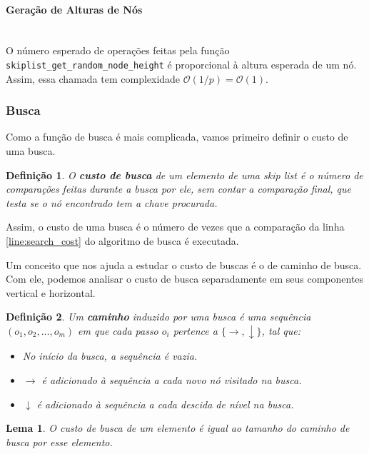 \documentclass[paper=a4, fontsize=11pt]{scrartcl} %
\newtheorem{definition}{Definição}
\newtheorem{lemma}[theorem]{Lema}
\numberwithin{equation}{section}
\numberwithin{figure}{section}
\numberwithin{table}{section}
\numberwithin{definition}{section}
\numberwithin{theorem}{section}
\numberwithin{property}{section}
\numberwithin{proposition}{section}
\newcommand{\cO}{\ensuremath{\mathcal{O}}}
\renewcommand{\sl}{\textit{skip list}\xspace}
\begin{document}
\paragraph{Geração de Alturas de Nós}
\ \\
O número esperado de operações feitas pela função \verb|skiplist_get_random_node_height| é proporcional à 
altura esperada de um nó. Assim, essa chamada tem complexidade $\cO(1/p) = \cO(1)$.

\subsubsection{Busca}

Como a função de busca é mais complicada, vamos primeiro definir o custo de uma busca.

\begin{definition}

O \textbf{custo de busca} de um elemento de uma \sl é o número de comparações feitas durante a busca por ele, sem
contar a comparação final, que testa se o nó encontrado tem a chave procurada.

\end{definition}

Assim, o custo de uma busca é o número de vezes que a comparação da linha \ref{line:search_cost} do algoritmo
de busca é executada.

Um conceito que nos ajuda a estudar o custo de buscas é o de caminho de busca. Com ele, podemos analisar o
custo de busca separadamente em seus componentes vertical e horizontal.

\begin{definition}

Um \textbf{caminho} induzido por uma busca é uma sequência $(o_1, o_2, \ldots, o_m)$ 
em que cada passo $o_i$ pertence a $\{\rightarrow, \downarrow\}$, tal que:

\begin{itemize}[noitemsep]
  \item No início da busca, a sequência é vazia.
  \item $\rightarrow$ é adicionado à sequência a cada novo nó visitado na busca.
  \item $\downarrow$ é adicionado à sequência a cada descida de nível na busca.
\end{itemize}

\end{definition}

\begin{lemma} \label{lemma:custo_busca_caminho}
O custo de busca de um elemento é igual ao tamanho do caminho de busca por esse elemento.
\end{lemma}
\end{document}
